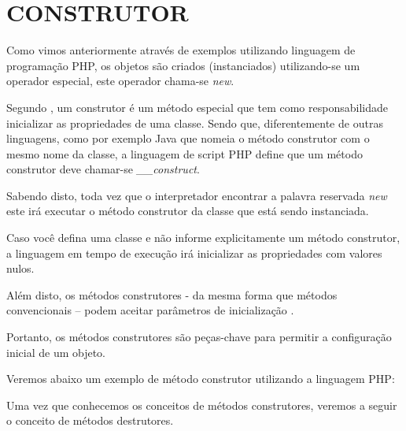 \section{CONSTRUTOR}

Como vimos anteriormente através de exemplos utilizando linguagem de 
programação PHP, os objetos são criados (instanciados) utilizando-se um 
operador especial, este operador chama-se \textit{new}.

Segundo , um construtor é um método especial que tem
como responsabilidade inicializar as propriedades de uma classe. Sendo que, 
diferentemente de outras linguagens, como por exemplo Java que nomeia o  método
construtor com o mesmo nome da classe, a linguagem de script PHP define  que um
método construtor deve chamar-se \textit{\_\_construct}.

Sabendo disto, toda vez que o interpretador encontrar a palavra reservada
\textit{new} este irá executar o método construtor da classe que está sendo 
instanciada.

Caso você defina uma classe e não informe explicitamente um método construtor, a
linguagem em tempo de execução irá inicializar as propriedades com valores nulos.

Além disto, os métodos construtores - da mesma forma que métodos convencionais –
podem aceitar parâmetros de inicialização \cite{learningJava}.

Portanto, os métodos construtores são peças-chave para permitir a configuração 
inicial de um objeto.

Veremos abaixo um exemplo de método construtor utilizando a linguagem PHP:

Uma vez que conhecemos os conceitos de métodos construtores, veremos a seguir  o
conceito de métodos destrutores.